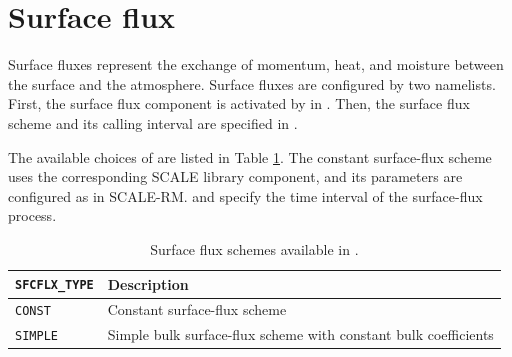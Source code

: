 \section{Surface flux}
\label{sec:basic_usel_surface_flux}

Surface fluxes represent the exchange of momentum, heat, and moisture
between the surface and the atmosphere.
Surface fluxes are configured by two namelists.
First, the surface flux component is activated by  in .
Then, the surface flux scheme and its calling interval are specified in .


The available choices of  are listed in Table \ref{tab:sfcflx_scheme_list}.
The constant surface-flux scheme uses the corresponding SCALE library component, and its parameters are configured as in SCALE-RM.
 and  specify the time interval of the surface-flux process.


\begin{table}[htbp]
\caption{Surface flux schemes available in \scaledg.}
\label{tab:sfcflx_scheme_list}
\begin{center}
\begin{tabularx}{150mm}{lX}
\hline
\rowcolor[gray]{0.9}
\verb|SFCFLX_TYPE| & Description \\
\hline
\verb|CONST|  & Constant surface-flux scheme \\
\verb|SIMPLE| & Simple bulk surface-flux scheme with constant bulk coefficients \\
\hline
\end{tabularx}
\end{center}
\end{table}

